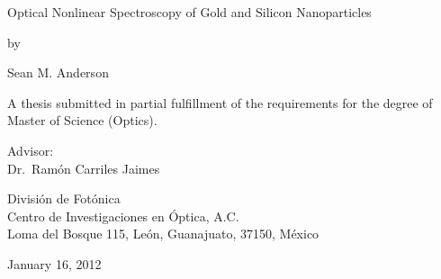 \begin{titlepage}
\begin{center}
{\Huge Optical Nonlinear Spectroscopy of Gold and Silicon Nanoparticles}
\vspace{1.0cm}

{\large by}
\vspace{1.0cm}

{\LARGE Sean M. Anderson}
\vspace{3cm}

{\Large A thesis submitted in partial fulfillment of the requirements for the degree of Master of Science (Optics).}
\vspace{4cm}

{\large Advisor:\\
Dr.~Ram\'on Carriles Jaimes
\vspace*{1cm}

Divisi\'on de Fot\'onica\\
Centro de Investigaciones en \'Optica, A.C.\\
Loma del Bosque 115, Le\'on, Guanajuato, 37150, M\'exico}
\vfill
January 16, 2012
\end{center}
\end{titlepage}
